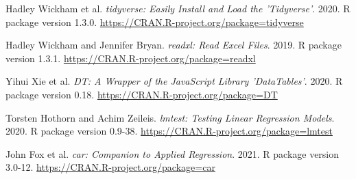 \documentclass[
  11pt,
  bookmarksnumbered]{article}
\begin{document}
\begin{thebibliography}{99}

Hadley Wickham et al. \emph{tidyverse: Easily Install and Load the 'Tidyverse'}. 2020. R package version 1.3.0. \url{https://CRAN.R-project.org/package=tidyverse}

Hadley Wickham and Jennifer Bryan. \emph{readxl: Read Excel Files}. 2019. R package version 1.3.1. \url{https://CRAN.R-project.org/package=readxl}

Yihui Xie et al. \emph{DT: A Wrapper of the JavaScript Library 'DataTables'}. 2020. R package version 0.18. \url{https://CRAN.R-project.org/package=DT}

Torsten Hothorn and Achim Zeileis. \emph{lmtest: Testing Linear Regression Models}. 2020. R package version 0.9-38. \url{https://CRAN.R-project.org/package=lmtest}

John Fox et al. \emph{car: Companion to Applied Regression}. 2021. R package version 3.0-12. \url{https://CRAN.R-project.org/package=car}

\end{thebibliography}

\printbibliography
\end{document}
